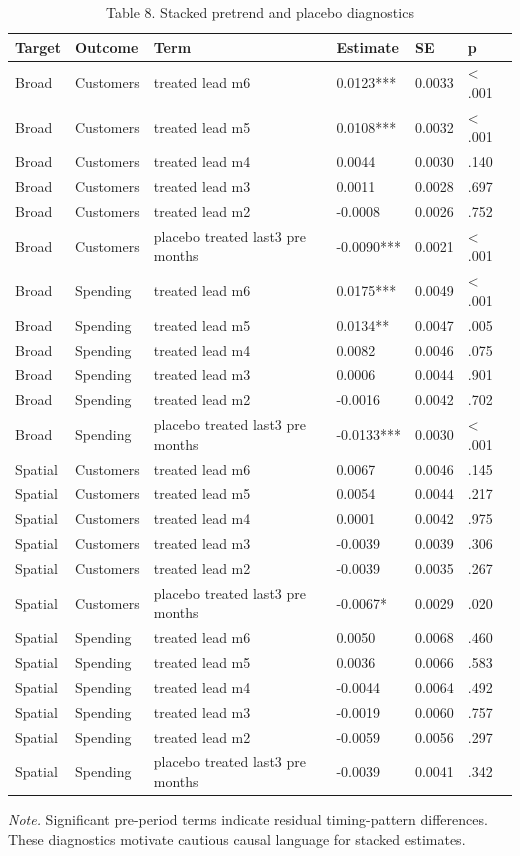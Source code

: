 \begin{table}[!htbp]
\centering
\caption{Table 8. Stacked pretrend and placebo diagnostics}
\begin{tabular}{llllll}
\toprule
Target & Outcome & Term & Estimate & SE & p \\
\midrule
Broad & Customers & treated lead m6 & 0.0123*** & 0.0033 & < .001 \\
Broad & Customers & treated lead m5 & 0.0108*** & 0.0032 & < .001 \\
Broad & Customers & treated lead m4 & 0.0044 & 0.0030 & .140 \\
Broad & Customers & treated lead m3 & 0.0011 & 0.0028 & .697 \\
Broad & Customers & treated lead m2 & -0.0008 & 0.0026 & .752 \\
Broad & Customers & placebo treated last3 pre months & -0.0090*** & 0.0021 & < .001 \\
Broad & Spending & treated lead m6 & 0.0175*** & 0.0049 & < .001 \\
Broad & Spending & treated lead m5 & 0.0134** & 0.0047 & .005 \\
Broad & Spending & treated lead m4 & 0.0082 & 0.0046 & .075 \\
Broad & Spending & treated lead m3 & 0.0006 & 0.0044 & .901 \\
Broad & Spending & treated lead m2 & -0.0016 & 0.0042 & .702 \\
Broad & Spending & placebo treated last3 pre months & -0.0133*** & 0.0030 & < .001 \\
Spatial & Customers & treated lead m6 & 0.0067 & 0.0046 & .145 \\
Spatial & Customers & treated lead m5 & 0.0054 & 0.0044 & .217 \\
Spatial & Customers & treated lead m4 & 0.0001 & 0.0042 & .975 \\
Spatial & Customers & treated lead m3 & -0.0039 & 0.0039 & .306 \\
Spatial & Customers & treated lead m2 & -0.0039 & 0.0035 & .267 \\
Spatial & Customers & placebo treated last3 pre months & -0.0067* & 0.0029 & .020 \\
Spatial & Spending & treated lead m6 & 0.0050 & 0.0068 & .460 \\
Spatial & Spending & treated lead m5 & 0.0036 & 0.0066 & .583 \\
Spatial & Spending & treated lead m4 & -0.0044 & 0.0064 & .492 \\
Spatial & Spending & treated lead m3 & -0.0019 & 0.0060 & .757 \\
Spatial & Spending & treated lead m2 & -0.0059 & 0.0056 & .297 \\
Spatial & Spending & placebo treated last3 pre months & -0.0039 & 0.0041 & .342 \\
\bottomrule
\end{tabular}
\begin{minipage}{0.95\linewidth}\footnotesize\emph{Note.} Significant pre-period terms indicate residual timing-pattern differences. These diagnostics motivate cautious causal language for stacked estimates.\end{minipage}
\end{table}
